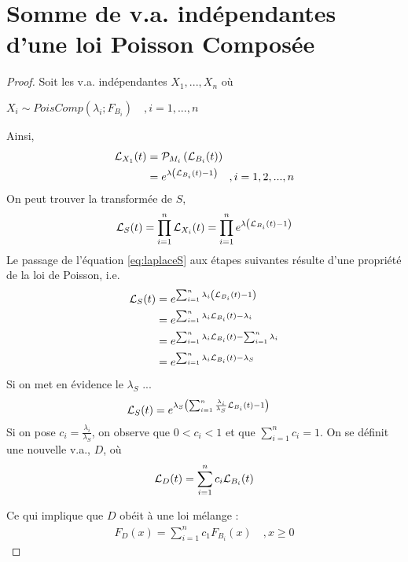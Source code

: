 \section{Somme de v.a. indépendantes d'une loi Poisson Composée}
\label{preuve:poissoncompose}
\begin{proof}
Soit les v.a. indépendantes $X_1, ..., X_n$ où

$X_i \sim PoisComp(\lambda_i ; F_{B_i}) \quad, i = 1, ..., n$


Ainsi,
\begin{align*}
\mathcal{L}_{X_1}(t)	& = \mathcal{P}_{M_i} \left( \mathcal{L}_{B_i}(t) \right) \\
	& = e^{\lambda \left( \mathcal{L}_{B_i}(t) - 1 \right)} \quad, i = 1,2, ... , n \\
\end{align*}
On peut trouver la transformée de $S$,
\begin{equation}
\label{eq:laplaceS}
\mathcal{L}_S(t) = \prod_{i=1}^n \mathcal{L}_{X_i}(t) = \prod_{i=1}^{n} e^{\lambda \left( \mathcal{L}_{B_i}(t) - 1 \right)}
\end{equation} 
Le passage de l'équation \eqref{eq:laplaceS} aux étapes suivantes résulte d'une propriété de la loi de Poisson, i.e.
\begin{align*}
\mathcal{L}_S(t)	& = e^{\sum_{i=1}^{n} \lambda_i \left( \mathcal{L}_{B_i}(t) - 1 \right)} \\
	& = e^{\sum_{i=1}^{n} \lambda_i \mathcal{L}_{B_i}(t) - \lambda_i} \\
	& = e^{\sum_{i=1}^{n}\lambda_i \mathcal{L}_{B_i}(t) - \sum_{i=1}^{n} \lambda_i} \\
		& = e^{\sum_{i=1}^{n}\lambda_i \mathcal{L}_{B_i}(t) - \lambda_S} \\
\end{align*}
Si on met en évidence le $\lambda_S$ ...
\begin{align}
\label{eq:lambdaevidence}
\mathcal{L}_S(t)	& = e^{\lambda_S \left( \sum_{i=1}^{n} \frac{\lambda_i}{\lambda_S} \mathcal{L}_{B_i}(t) - 1 \right)}
\end{align}
Si on pose $c_i = \frac{\lambda_i}{\lambda_S}$, on observe que $0 < c_i < 1$ et que $\sum_{i=1}^{n} c_i = 1$.
\p
On se définit une nouvelle v.a., $D$, où
\begin{align}
\label{eq:variablealeaD}
\mathcal{L}_D(t) = \sum_{i=1}^{n} c_i \mathcal{L}_{B_i}(t)
\end{align}

Ce qui implique que $D$ obéit à une loi mélange : 
\begin{align*}
F_D(x) = \sum_{i=1}^{n} c_1 F_{B_i}(x) \quad, x \ge 0
\end{align*}


\end{proof}
